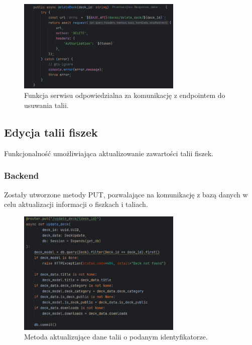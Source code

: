 \begin{figure}[H]
    \centering
    \includegraphics[width=0.7\textwidth]{chapters/chapter_8/screens/delete_deck_web}
    \caption{Funkcja serwisu odpowiedzialna za komunikację z endpointem do usuwania talii.}
    \label{img:delete_deck_web}
\end{figure}

\subsection{Edycja talii fiszek}

Funkcjonalność umożliwiająca aktualizowanie zawartości talii fiszek.

\subsubsection{Backend}

Zostały utworzone metody PUT, pozwalające na komunikację z bazą danych w celu aktualizacji informacji o fiszkach i taliach.

\begin{figure}[H]
    \centering
    \includegraphics[width=0.7\textwidth]{chapters/chapter_8/screens/update_deck_backend}
    \caption{Metoda aktualizujące dane talii o podanym identyfikatorze.}
    \label{img:update_deck_backend}
\end{figure}

